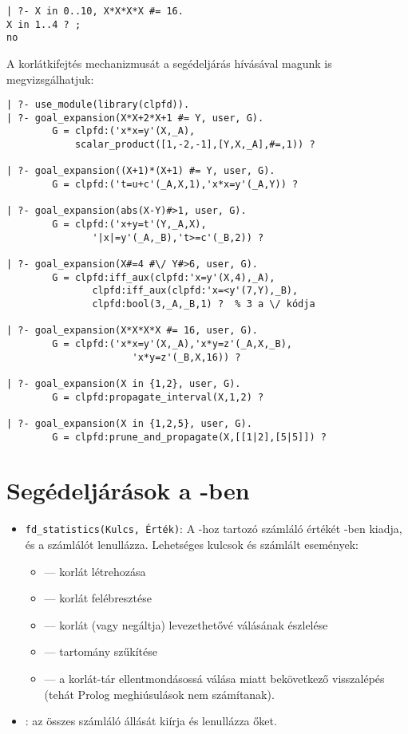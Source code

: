 \begin{verbatim}
| ?- X in 0..10, X*X*X*X #= 16.
X in 1..4 ? ;
no
\end{verbatim}

A korlátkifejtés mechanizmusát a  segédeljárás
hívásával magunk is megvizsgálhatjuk:

\begin{verbatim}
| ?- use_module(library(clpfd)).
| ?- goal_expansion(X*X+2*X+1 #= Y, user, G).
        G = clpfd:('x*x=y'(X,_A),
            scalar_product([1,-2,-1],[Y,X,_A],#=,1)) ?

| ?- goal_expansion((X+1)*(X+1) #= Y, user, G).
        G = clpfd:('t=u+c'(_A,X,1),'x*x=y'(_A,Y)) ?

| ?- goal_expansion(abs(X-Y)#>1, user, G).
        G = clpfd:('x+y=t'(Y,_A,X),
               '|x|=y'(_A,_B),'t>=c'(_B,2)) ?

| ?- goal_expansion(X#=4 #\/ Y#>6, user, G).
        G = clpfd:iff_aux(clpfd:'x=y'(X,4),_A),
               clpfd:iff_aux(clpfd:'x=<y'(7,Y),_B),
               clpfd:bool(3,_A,_B,1) ?  % 3 a \/ kódja

| ?- goal_expansion(X*X*X*X #= 16, user, G).
        G = clpfd:('x*x=y'(X,_A),'x*y=z'(_A,X,_B),
                      'x*y=z'(_B,X,16)) ?

| ?- goal_expansion(X in {1,2}, user, G).
        G = clpfd:propagate_interval(X,1,2) ?

| ?- goal_expansion(X in {1,2,5}, user, G).
        G = clpfd:prune_and_propagate(X,[[1|2],[5|5]]) ?
\end{verbatim}

\section{Segédeljárások a \Clpfd -ben}

\begin{itemize}
\item {\tt fd\_statistics(Kulcs, Érték)}: A -hoz tartozó
        számláló értékét -ben kiadja, és a számlálót lenullázza.
        Lehetséges kulcsok és számlált események:
\begin{itemize}
\item {} --- korlát létrehozása
\item {} --- korlát felébresztése
\item {} --- korlát (vagy negáltja) levezethetővé válásának
        észlelése
\item {}    --- tartomány szűkítése
\item {}  --- a korlát-tár ellentmondásossá válása miatt
        bekövetkező visszalépés (tehát Prolog meghiúsulások nem számítanak).
\end{itemize}
\item {}: az összes számláló állását kiírja és
        lenullázza őket.
\end{itemize}

